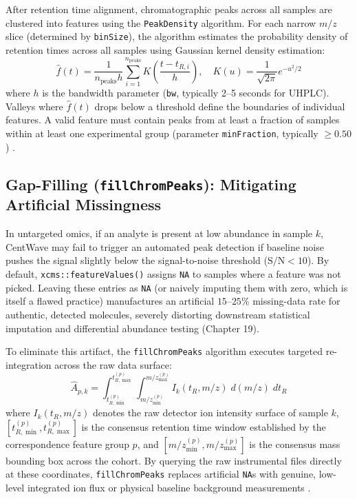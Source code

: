 \documentclass[11pt,twoside,openright]{book}
\begin{document}
After retention time alignment, chromatographic peaks across all samples are clustered into features using the \texttt{PeakDensity} algorithm. For each narrow $m/z$ slice (determined by \texttt{binSize}), the algorithm estimates the probability density of retention times across all samples using Gaussian kernel density estimation:
\begin{equation}
\label{eq:kde_rt}
\hat{f}(t) = \frac{1}{n_{\text{peaks}} h} \sum_{i=1}^{n_{\text{peaks}}} K\left( \frac{t - t_{R, i}}{h} \right), \quad K(u) = \frac{1}{\sqrt{2\pi}} e^{-u^2/2}
\end{equation}
where $h$ is the bandwidth parameter (\texttt{bw}, typically 2--5 seconds for UHPLC). Valleys where $\hat{f}(t)$ drops below a threshold define the boundaries of individual features. A valid feature must contain peaks from at least a fraction of samples within at least one experimental group (parameter \texttt{minFraction}, typically $\ge 0.50$) \cite{mclean2021metabolomics}.

\subsection{Gap-Filling (\texttt{fillChromPeaks}): Mitigating Artificial Missingness}

In untargeted omics, if an analyte is present at low abundance in sample $k$, CentWave may fail to trigger an automated peak detection if baseline noise pushes the signal slightly below the signal-to-noise threshold ($\text{S/N} < 10$). By default, \texttt{xcms::featureValues()} assigns \texttt{NA} to samples where a feature was not picked. Leaving these entries as \texttt{NA} (or naively imputing them with zero, which is itself a flawed practice) manufactures an artificial $15$--$25\%$ missing-data rate for authentic, detected molecules, severely distorting downstream statistical imputation and differential abundance testing (Chapter 19).

To eliminate this artifact, the \texttt{fillChromPeaks} algorithm executes targeted re-integration across the raw data surface:
\begin{equation}
\label{eq:gap_fill}
\hat{A}_{p, k} = \int_{t_{R, \min}^{(p)}}^{t_{R, \max}^{(p)}} \int_{m/z_{\min}^{(p)}}^{m/z_{\max}^{(p)}} I_k(t_R, m/z) \; d(m/z) \; dt_R
\end{equation}
where $I_k(t_R, m/z)$ denotes the raw detector ion intensity surface of sample $k$, $[t_{R, \min}^{(p)}, t_{R, \max}^{(p)}]$ is the consensus retention time window established by the correspondence feature group $p$, and $[m/z_{\min}^{(p)}, m/z_{\max}^{(p)}]$ is the consensus mass bounding box across the cohort. By querying the raw instrumental files directly at these coordinates, \texttt{fillChromPeaks} replaces artificial \texttt{NA}s with genuine, low-level integrated ion flux or physical baseline background measurements \cite{benton2015evaluating, gieling2020assessment}.
\end{document}

